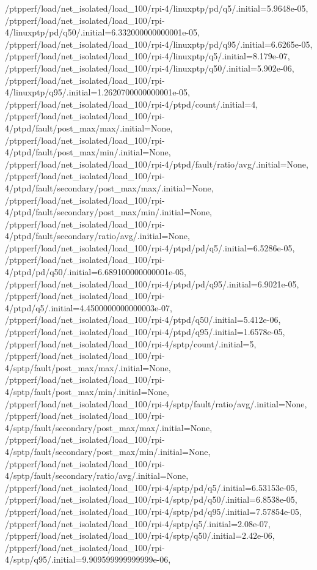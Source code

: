 {    /ptpperf/load/net_isolated/load_100/rpi-4/linuxptp/pd/q5/.initial=5.9648e-05,
    /ptpperf/load/net_isolated/load_100/rpi-4/linuxptp/pd/q50/.initial=6.332000000000001e-05,
    /ptpperf/load/net_isolated/load_100/rpi-4/linuxptp/pd/q95/.initial=6.6265e-05,
    /ptpperf/load/net_isolated/load_100/rpi-4/linuxptp/q5/.initial=8.179e-07,
    /ptpperf/load/net_isolated/load_100/rpi-4/linuxptp/q50/.initial=5.902e-06,
    /ptpperf/load/net_isolated/load_100/rpi-4/linuxptp/q95/.initial=1.2620700000000001e-05,
    /ptpperf/load/net_isolated/load_100/rpi-4/ptpd/count/.initial=4,
    /ptpperf/load/net_isolated/load_100/rpi-4/ptpd/fault/post_max/max/.initial=None,
    /ptpperf/load/net_isolated/load_100/rpi-4/ptpd/fault/post_max/min/.initial=None,
    /ptpperf/load/net_isolated/load_100/rpi-4/ptpd/fault/ratio/avg/.initial=None,
    /ptpperf/load/net_isolated/load_100/rpi-4/ptpd/fault/secondary/post_max/max/.initial=None,
    /ptpperf/load/net_isolated/load_100/rpi-4/ptpd/fault/secondary/post_max/min/.initial=None,
    /ptpperf/load/net_isolated/load_100/rpi-4/ptpd/fault/secondary/ratio/avg/.initial=None,
    /ptpperf/load/net_isolated/load_100/rpi-4/ptpd/pd/q5/.initial=6.5286e-05,
    /ptpperf/load/net_isolated/load_100/rpi-4/ptpd/pd/q50/.initial=6.689100000000001e-05,
    /ptpperf/load/net_isolated/load_100/rpi-4/ptpd/pd/q95/.initial=6.9021e-05,
    /ptpperf/load/net_isolated/load_100/rpi-4/ptpd/q5/.initial=4.4500000000000003e-07,
    /ptpperf/load/net_isolated/load_100/rpi-4/ptpd/q50/.initial=5.412e-06,
    /ptpperf/load/net_isolated/load_100/rpi-4/ptpd/q95/.initial=1.6578e-05,
    /ptpperf/load/net_isolated/load_100/rpi-4/sptp/count/.initial=5,
    /ptpperf/load/net_isolated/load_100/rpi-4/sptp/fault/post_max/max/.initial=None,
    /ptpperf/load/net_isolated/load_100/rpi-4/sptp/fault/post_max/min/.initial=None,
    /ptpperf/load/net_isolated/load_100/rpi-4/sptp/fault/ratio/avg/.initial=None,
    /ptpperf/load/net_isolated/load_100/rpi-4/sptp/fault/secondary/post_max/max/.initial=None,
    /ptpperf/load/net_isolated/load_100/rpi-4/sptp/fault/secondary/post_max/min/.initial=None,
    /ptpperf/load/net_isolated/load_100/rpi-4/sptp/fault/secondary/ratio/avg/.initial=None,
    /ptpperf/load/net_isolated/load_100/rpi-4/sptp/pd/q5/.initial=6.53153e-05,
    /ptpperf/load/net_isolated/load_100/rpi-4/sptp/pd/q50/.initial=6.8538e-05,
    /ptpperf/load/net_isolated/load_100/rpi-4/sptp/pd/q95/.initial=7.57854e-05,
    /ptpperf/load/net_isolated/load_100/rpi-4/sptp/q5/.initial=2.08e-07,
    /ptpperf/load/net_isolated/load_100/rpi-4/sptp/q50/.initial=2.42e-06,
    /ptpperf/load/net_isolated/load_100/rpi-4/sptp/q95/.initial=9.909599999999999e-06,
}
